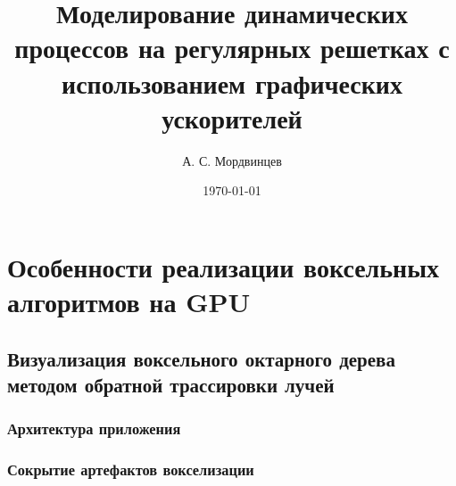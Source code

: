 \documentclass[a4paper,14pt]{extreport}
\begin{document}
\title{Моделирование динамических процессов на регулярных решетках с использованием графических ускорителей}
\author{А. С. Мордвинцев}
\date{\today}


\sloppy  %

\maketitle

\setcounter{page}{3}

\tableofcontents






\chapter{Особенности реализации воксельных алгоритмов на GPU}
\section{Визуализация воксельного октарного дерева методом обратной трассировки лучей}
\subsection{Архитектура приложения}

\subsection{Сокрытие артефактов вокселизации}
\end{document}
